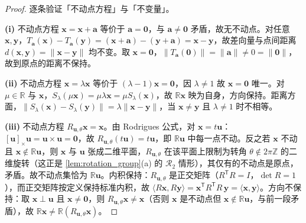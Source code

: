 \begin{proof}
逐条验证「不动点方程」与「不变量」。

\textbf{(i)} 不动点方程 $\mathbf x = \mathbf x + \mathbf a$ 等价于 $\mathbf a = \mathbf 0$，与 $\mathbf a\ne\mathbf 0$ 矛盾，故无不动点。对任意 $\mathbf x,\mathbf y$，$T_{\mathbf a}(\mathbf x)-T_{\mathbf a}(\mathbf y)=(\mathbf x+\mathbf a)-(\mathbf y+\mathbf a)=\mathbf x-\mathbf y$，故差向量与点间距离 $d(\mathbf x,\mathbf y)=\|\mathbf x-\mathbf y\|$ 均不变。取 $\mathbf x=\mathbf 0$，$\|T_{\mathbf a}(\mathbf 0)\|=\|\mathbf a\|\ne 0=\|\mathbf 0\|$，故到原点的距离不保持。

\textbf{(ii)} 不动点方程 $\mathbf x=\lambda\mathbf x$ 等价于 $(\lambda-1)\mathbf x=\mathbf 0$，因 $\lambda\ne1$ 故 $\mathbf x=\mathbf 0$ 唯一。对 $\mu\in\mathbb R$ 与 $\mathbf x$，$S_\lambda(\mu\mathbf x)=\mu\lambda\mathbf x=\mu S_\lambda(\mathbf x)$，故 $\mathbb R\mathbf x$ 映为自身，方向保持。距离方面，$\|S_\lambda(\mathbf x)-S_\lambda(\mathbf y)\|=\lambda\|\mathbf x-\mathbf y\|$，当 $\mathbf x\ne\mathbf y$ 且 $\lambda\ne1$ 时不相等。

\textbf{(iii)} 不动点方程 $R_{\mathbf u,\theta}\mathbf x=\mathbf x$。由 Rodrigues 公式，对 $\mathbf x=t\mathbf u$：$[\mathbf u]_\times\mathbf u=\mathbf u\times\mathbf u=\mathbf 0$，故 $R_{\mathbf u,\theta}(t\mathbf u)=t\mathbf u$，即 $\mathbb R\mathbf u$ 中每一点不动。反之若 $\mathbf x$ 不动且 $\mathbf x\notin\mathbb R\mathbf u$，则 $\mathbf x$ 与 $\mathbf u$ 张成二维平面，$R_{\mathbf u,\theta}$ 在该平面上限制为转角 $\theta\notin2\pi\mathbb Z$ 的二维旋转（这正是 \cref{lem:rotation_group}(a) 的 $\mathcal R_2$ 情形），其仅有的不动点是原点，矛盾。故不动点集恰为 $\mathbb R\mathbf u$。内积保持：$R_{\mathbf u,\theta}$ 是正交矩阵（$R^{\mathsf T}R=I$，$\det R=1$），而正交矩阵按定义保持标准内积，故 $\langle R\mathbf x,R\mathbf y\rangle=\mathbf x^{\mathsf T}R^{\mathsf T}R\,\mathbf y=\langle\mathbf x,\mathbf y\rangle$。方向不保持：取 $\mathbf x\perp\mathbf u$ 且 $\mathbf x\ne\mathbf 0$，则 $R_{\mathbf u,\theta}\mathbf x\ne\mathbf x$（否则 $\mathbf x$ 是不动点但 $\mathbf x\notin\mathbb R\mathbf u$，与前一段矛盾），故 $\mathbb R\mathbf x\ne\mathbb R(R_{\mathbf u,\theta}\mathbf x)$。
\end{proof}

